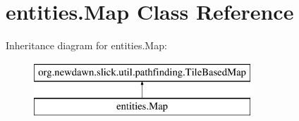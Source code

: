 \hypertarget{classentities_1_1_map}{}\section{entities.\+Map Class Reference}
\label{classentities_1_1_map}
Inheritance diagram for entities.\+Map\+:\begin{figure}[H]
\begin{center}
\leavevmode
\includegraphics[height=2.000000cm]{classentities_1_1_map}
\end{center}
\end{figure}
